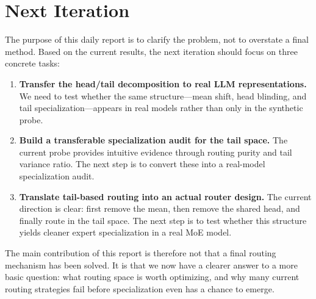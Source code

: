 \documentclass[11pt]{article}
\begin{document}
\section{Next Iteration}

The purpose of this daily report is to clarify the problem, not to overstate a final method. Based on the current results, the next iteration should focus on three concrete tasks:

\begin{enumerate}
    \item \textbf{Transfer the head/tail decomposition to real LLM representations.}  
    We need to test whether the same structure---mean shift, head blinding, and tail specialization---appears in real models rather than only in the synthetic probe.

    \item \textbf{Build a transferable specialization audit for the tail space.}  
    The current probe provides intuitive evidence through routing purity and tail variance ratio. The next step is to convert these into a real-model specialization audit.

    \item \textbf{Translate tail-based routing into an actual router design.}  
    The current direction is clear: first remove the mean, then remove the shared head, and finally route in the tail space. The next step is to test whether this structure yields cleaner expert specialization in a real MoE model.
\end{enumerate}

The main contribution of this report is therefore not that a final routing mechanism has been solved. It is that we now have a clearer answer to a more basic question: what routing space is worth optimizing, and why many current routing strategies fail before specialization even has a chance to emerge.
\end{document}
